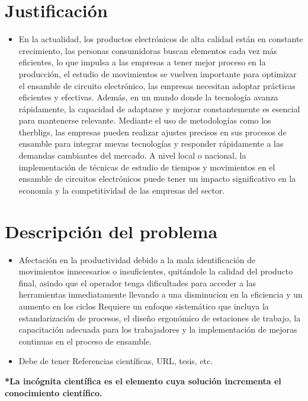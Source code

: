   \section{Justificación}
  
  \begin{itemize}
      \item En la actualidad, los productos electrónicos de alta calidad están en constante crecimiento, las personas consumidoras buscan elementos cada vez más eficientes, lo que impulsa a las empresas a tener mejor proceso en la producción, el estudio de movimientos se vuelven importante para optimizar el ensamble de circuito electrónico, las empresas necesitan adoptar prácticas eficientes y efectivas.
      Además, en un mundo donde la tecnología avanza rápidamente, la capacidad de adaptarse y mejorar constantemente es esencial para mantenerse relevante.
      Mediante el uso de metodologías como los therbligs, las empresas pueden realizar ajustes precisos en sus procesos de ensamble para integrar nuevas tecnologías y
  responder rápidamente a las demandas cambiantes del mercado.
  A nivel local o nacional, la implementación de técnicas de estudio de tiempos y movimientos en el ensamble de circuitos electrónicos puede tener un impacto significativo en la economía y la
  competitividad de las empresas del sector.
  
  \end{itemize}
  \section{Descripción del problema}
  \begin{itemize}
      \item Afectación en la productividad debido a la mala identificación de movimientos innecesarios o insuficientes, quitándole la calidad del producto final, asindo que el operador tenga dificultades para acceder a las herramientas inmediatamente llevando a una disminucion en la eficiencia y un aumento en los ciclos 
     Requiere un enfoque sistemático que incluya la estandarización de
  procesos, el diseño ergonómico de estaciones de trabajo, la capacitación adecuada para los trabajadores y la implementación de mejoras continuas en el proceso de
  ensamble.
      \item Debe de tener Referencias científicas, URL, tesis, etc.
  \end{itemize}
  
  \textbf{*La incógnita científica es el elemento cuya solución incrementa el conocimiento científico.}
